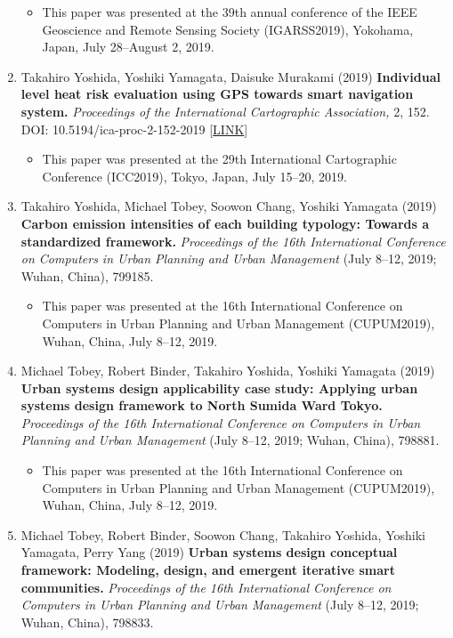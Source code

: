 \documentclass[]{book}
\providecommand{\tightlist}{%
  \setlength{\itemsep}{0pt}\setlength{\parskip}{0pt}}
\begin{document}
\begin{enumerate}
  \begin{itemize}
  \tightlist
  \item
    This paper was presented at the 39th annual conference of the IEEE Geoscience and Remote Sensing Society (IGARSS2019), Yokohama, Japan, July 28--August 2, 2019.
  \end{itemize}
\item
  Takahiro Yoshida, Yoshiki Yamagata, Daisuke Murakami (2019)
  \textbf{Individual level heat risk evaluation using GPS towards smart navigation system.}
  \emph{Proceedings of the International Cartographic Association,} 2, 152.
  DOI: 10.5194/ica-proc-2-152-2019 {[}\href{https://www.proc-int-cartogr-assoc.net/2/152/2019/}{LINK}{]}

  \begin{itemize}
  \tightlist
  \item
    This paper was presented at the 29th International Cartographic Conference (ICC2019), Tokyo, Japan, July 15--20, 2019.
  \end{itemize}
\item
  Takahiro Yoshida, Michael Tobey, Soowon Chang, Yoshiki Yamagata (2019)
  \textbf{Carbon emission intensities of each building typology: Towards a standardized framework.}
  \emph{Proceedings of the 16th International Conference on Computers in Urban Planning and Urban Management} (July 8--12, 2019; Wuhan, China), 799185.

  \begin{itemize}
  \tightlist
  \item
    This paper was presented at the 16th International Conference on Computers in Urban Planning and Urban Management (CUPUM2019), Wuhan, China, July 8--12, 2019.
  \end{itemize}
\item
  Michael Tobey, Robert Binder, Takahiro Yoshida, Yoshiki Yamagata (2019)
  \textbf{Urban systems design applicability case study: Applying urban systems design framework to North Sumida Ward Tokyo.}
  \emph{Proceedings of the 16th International Conference on Computers in Urban Planning and Urban Management} (July 8--12, 2019; Wuhan, China), 798881.

  \begin{itemize}
  \tightlist
  \item
    This paper was presented at the 16th International Conference on Computers in Urban Planning and Urban Management (CUPUM2019), Wuhan, China, July 8--12, 2019.
  \end{itemize}
\item
  Michael Tobey, Robert Binder, Soowon Chang, Takahiro Yoshida, Yoshiki Yamagata, Perry Yang (2019)
  \textbf{Urban systems design conceptual framework: Modeling, design, and emergent iterative smart communities.}
  \emph{Proceedings of the 16th International Conference on Computers in Urban Planning and Urban Management} (July 8--12, 2019; Wuhan, China), 798833.


\end{enumerate}
\end{document}
